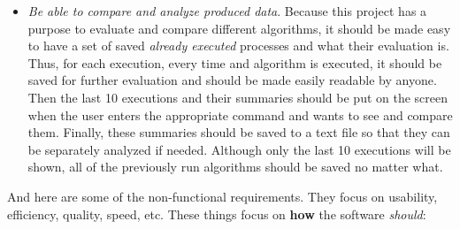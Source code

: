\documentclass{article}
\begin{document}
\begin{itemize}
\item \textit{Be able to compare and analyze produced data}. Because this project has a purpose to evaluate and compare different algorithms, it should be made easy to have a set of saved \textit{already executed} processes and what their evaluation is. Thus, for each execution, every time and algorithm is executed, it should be saved for further evaluation and should be made easily readable by anyone. Then the last 10 executions and their summaries should be put on the screen when the user enters the appropriate command and wants to see and compare them. Finally, these summaries should be saved to a text file so that they can be separately analyzed if needed. Although only the last 10 executions will be shown, all of the previously run algorithms should be saved no matter what.
\end{itemize}

And here are some of the non-functional requirements. They focus on usability, efficiency, quality, speed, etc. These things focus on \textbf{how} the software \textit{should}:
\end{document}
